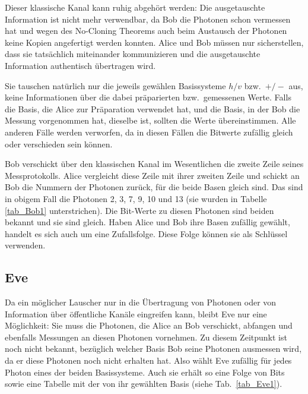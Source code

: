 Dieser klassische Kanal kann ruhig abgeh\"ort werden: Die ausgetauschte Information ist nicht
mehr verwendbar, da Bob die Photonen schon vermessen hat und wegen des No-Cloning Theorems
auch beim Austausch der Photonen keine Kopien angefertigt werden konnten. Alice und Bob m\"ussen
nur sicherstellen, dass sie tats\"achlich miteinander kommunizieren und die ausgetauschte Information
authentisch \"ubertragen wird. 

Sie tauschen nat\"urlich nur die jeweils gew\"ahlen Basissysteme $h/v$ bzw.\ $+/-$ aus, keine
Informationen \"uber die dabei pr\"aparierten bzw.\ gemessenen Werte. Falls die Basis, die Alice zur
Pr\"aparation verwendet hat, und die Basis, in der Bob die Messung vorgenommen hat, dieselbe ist,
sollten die Werte \"ubereinstimmen. Alle anderen F\"alle werden verworfen, da in diesen F\"allen die
Bitwerte zuf\"allig gleich oder verschieden sein k\"onnen. 

Bob verschickt \"uber den klassischen Kanal im Wesentlichen die zweite Zeile seines Messprotokolls. 
Alice vergleicht diese Zeile mit ihrer zweiten Zeile und schickt an Bob die Nummern der Photonen zur\"uck,
f\"ur die beide Basen gleich sind. Das sind in obigem Fall die Photonen 2, 3, 7, 9, 10 und 13 (sie
wurden in Tabelle \ref{tab_Bob1} unterstrichen). 
Die Bit-Werte zu
diesen Photonen sind beiden bekannt und sie sind gleich. Haben Alice und Bob ihre Basen zuf\"allig
gew\"ahlt, handelt es sich auch um eine Zufallsfolge. Diese Folge k\"onnen sie als Schl\"ussel verwenden. 

\subsection{Eve}
\label{sec_Eve}

Da ein m\"oglicher Lauscher nur in die \"Ubertragung von Photonen oder von Information \"uber \"offentliche
Kan\"ale eingreifen kann, bleibt Eve nur eine M\"oglichkeit: Sie muss die Photonen, die Alice an Bob verschickt,
abfangen und ebenfalls Messungen an diesen Photonen vornehmen. Zu diesem Zeitpunkt ist noch nicht bekannt,
bez\"uglich welcher Basis Bob seine Photonen ausmessen wird, da er diese Photonen noch nicht
erhalten hat. Also w\"ahlt Eve zuf\"allig 
f\"ur jedes Photon eines der beiden Basissysteme. Auch sie erh\"alt so eine Folge von Bits sowie eine Tabelle
mit der von ihr gew\"ahlten Basis (siehe Tab.\ \ref{tab_Eve1}).    

